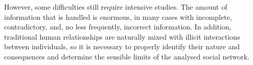 {%

However, some difficulties still require intensive studies. The amount of information that is handled is enormous, in many cases with incomplete, contradictory, and, no less frequently, incorrect information. In addition, traditional human relationships are naturally mixed with illicit interactions between individuals, so it is necessary to properly identify their nature and consequences and determine the sensible limits of the analysed social network.


}
